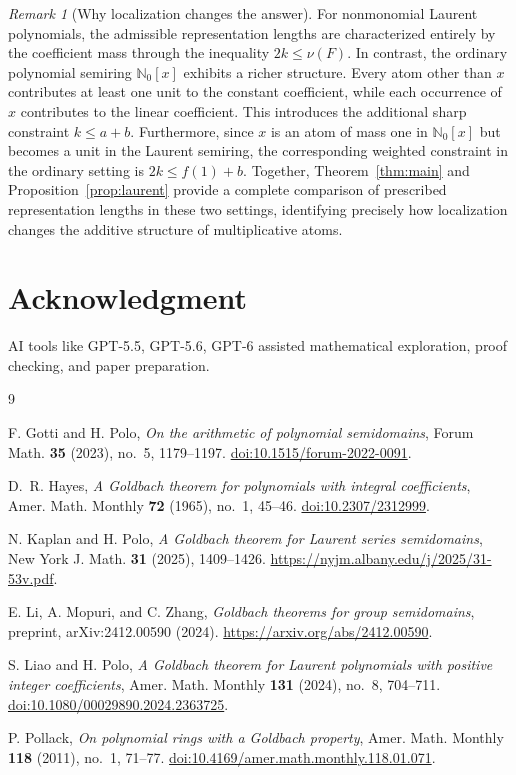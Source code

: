 \documentclass[11pt]{amsart}
\newcommand{\Nzero}{\mathbb N_0}
\theoremstyle{definition}
\theoremstyle{remark}
\newtheorem{remark}[theorem]{Remark}
\begin{document}
\begin{remark}[Why localization changes the answer]
For nonmonomial Laurent polynomials, the admissible representation
lengths are characterized entirely by the coefficient mass through
the inequality $2k\le\nu(F)$. In contrast, the ordinary polynomial
semiring $\Nzero[x]$ exhibits a richer structure. Every atom other
than $x$ contributes at least one unit to the constant coefficient,
while each occurrence of $x$ contributes to the linear coefficient.
This introduces the additional sharp constraint $k\le a+b$.
Furthermore, since $x$ is an atom of mass one in $\Nzero[x]$
but becomes a unit in the Laurent semiring, the corresponding
weighted constraint in the ordinary setting is
$2k\le f(1)+b$. Together, Theorem~\ref{thm:main} and
Proposition~\ref{prop:laurent} provide a complete comparison
of prescribed representation lengths in these two settings,
identifying precisely how localization changes the additive
structure of multiplicative atoms.
\end{remark}

\section*{Acknowledgment}
AI tools like GPT-5.5, GPT-5.6, GPT-6 assisted mathematical exploration, proof
checking, and paper preparation.

\begin{thebibliography}{9}

F. Gotti and H. Polo,
\emph{On the arithmetic of polynomial semidomains},
Forum Math. \textbf{35} (2023), no.~5, 1179--1197.
\href{https://doi.org/10.1515/forum-2022-0091}{doi:10.1515/forum-2022-0091}.

D.~R. Hayes,
\emph{A Goldbach theorem for polynomials with integral coefficients},
Amer. Math. Monthly \textbf{72} (1965), no.~1, 45--46.
\href{https://doi.org/10.2307/2312999}{doi:10.2307/2312999}.

N. Kaplan and H. Polo,
\emph{A Goldbach theorem for Laurent series semidomains},
New York J. Math. \textbf{31} (2025), 1409--1426.
\url{https://nyjm.albany.edu/j/2025/31-53v.pdf}.

E. Li, A. Mopuri, and C. Zhang,
\emph{Goldbach theorems for group semidomains},
preprint, arXiv:2412.00590 (2024).
\url{https://arxiv.org/abs/2412.00590}.

S. Liao and H. Polo,
\emph{A Goldbach theorem for Laurent polynomials with positive integer coefficients},
Amer. Math. Monthly \textbf{131} (2024), no.~8, 704--711.
\href{https://doi.org/10.1080/00029890.2024.2363725}{doi:10.1080/00029890.2024.2363725}.

P. Pollack,
\emph{On polynomial rings with a Goldbach property},
Amer. Math. Monthly \textbf{118} (2011), no.~1, 71--77.
\href{https://doi.org/10.4169/amer.math.monthly.118.01.071}{doi:10.4169/amer.math.monthly.118.01.071}.

\end{thebibliography}
\end{document}
